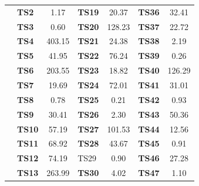 \begin{table}[]
{\begin{tabular}{|l|l|S[table-format=3.2]|l|S[table-format=3.2]|l|S[table-format=3.2]|}
			& \textbf{TS2}       & 1.17                            & \textbf{TS19}      & 20.37                          & \textbf{TS36}      & 32.41                          \\  
			& \textbf{TS3}       & 0.60                            & \textbf{TS20}      & 128.23                         & \textbf{TS37}      & 22.72                          \\  
			& \textbf{TS4}       & 403.15  & \textbf{TS21}      & 24.38                          & \textbf{TS38}      & 2.19                           \\  
			& \textbf{TS5}       & 41.95                           & \textbf{TS22}      & 76.24                          & \textbf{TS39}      & 0.26                           \\  
			& \textbf{TS6}       & 203.55                          & \textbf{TS23}      & 18.82                          & \textbf{TS40}      & 126.29                         \\  
			& \textbf{TS7}       & 19.69                           & \textbf{TS24}      & 72.01                          & \textbf{TS41}      & 31.01                          \\  
			& \textbf{TS8}       & 0.78                            & \textbf{TS25}      & 0.21                           & \textbf{TS42}      & 0.93                           \\  
			& \textbf{TS9}       & 30.41                           & \textbf{TS26}      & 2.30                           & \textbf{TS43}      & 50.36                          \\  
			& \textbf{TS10}      & 57.19                           & \textbf{TS27}      & 101.53                         & \textbf{TS44}      & 12.56                          \\  
			& \textbf{TS11}      & 68.92                           & \textbf{TS28}      & 43.67                          & \textbf{TS45}      & 0.91                           \\  
			& \textbf{TS12}      & 74.19                           & TS29               & 0.90                           & \textbf{TS46}      & 27.28                          \\  
			& \textbf{TS13}      & 263.99                          & \textbf{TS30}      & 4.02                           & \textbf{TS47}      & 1.10                           \\  

\end{tabular}}
\end{table}
